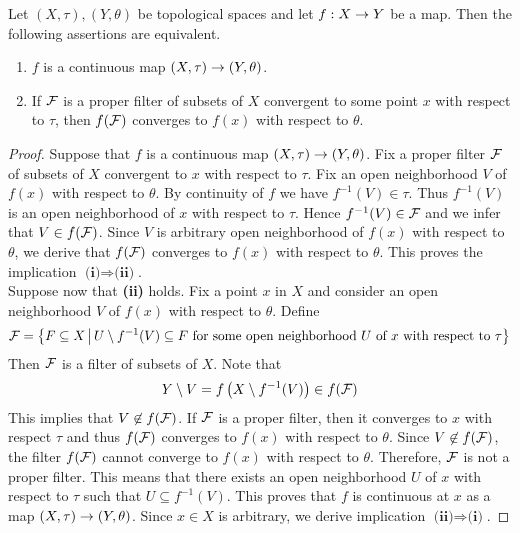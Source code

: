 \begin{proposition}\label{proposition:characterization_of_continuous_maps_in_terms_of_filters}
Let $(X,\tau),(Y,\theta)$ be topological spaces and let $f:X\rightarrow Y$ be a map. Then the following assertions are equivalent.
\begin{enumerate}[label=\emph{\textbf{(\roman*)}}, leftmargin=*]
\item $f$ is a continuous map $\left(X,\tau\right)\rightarrow \left(Y,\theta\right)$.
\item If ${\mathcal F}$ is a proper filter of subsets of $X$ convergent to some point $x$ with respect to $\tau$, then $f({\mathcal F})$ converges to $f(x)$ with respect to $\theta$.
\end{enumerate}
\end{proposition}
\begin{proof}
Suppose that $f$ is a continuous map $\left(X,\tau\right)\rightarrow \left(Y,\theta\right)$. Fix a proper filter ${\mathcal F}$ of subsets of $X$ convergent to $x$ with respect to $\tau$. Fix an open neighborhood $V$ of $f(x)$ with respect to $\theta$. By continuity of $f$ we have $f^{-1}(V) \in \tau$. Thus $f^{-1}(V)$ is an open neighborhood of $x$ with respect to $\tau$. Hence $f^{-1}(V) \in {\mathcal F}$ and we infer that $V \in f({\mathcal F})$. Since $V$ is arbitrary open neighborhood of $f(x)$ with respect to $\theta$, we derive that $f({\mathcal F})$ converges to $f(x)$ with respect to $\theta$. This proves the implication $\textbf{(i)}\Rightarrow \textbf{(ii)}$.\\
Suppose now that \textbf{(ii)} holds. Fix a point $x$ in $X$ and consider an open neighborhood $V$ of $f(x)$ with respect to $\theta$. Define
$${\mathcal F} = \big\{F\subseteq X\,\big|\,U\setminus f^{-1}(V)\subseteq F\mbox{ for some open neighborhood }U\mbox{ of }x\mbox{ with respect to }\tau\big\}$$
Then ${\mathcal F}$ is a filter of subsets of $X$. Note that
$$Y\setminus V = f\left(X\setminus f^{-1}(V)\right) \in f({\mathcal F})$$
This implies that $V \not \in f({\mathcal F})$. If ${\mathcal F}$ is a proper filter, then it converges to $x$ with respect $\tau$ and thus $f({\mathcal F})$ converges to $f(x)$ with respect to $\theta$. Since $V \not \in f({\mathcal F})$, the filter $f({\mathcal F})$ cannot converge to $f(x)$ with respect to $\theta$. Therefore, ${\mathcal F}$ is not a proper filter. This means that there exists an open neighborhood $U$ of $x$ with respect to $\tau$ such that $U \subseteq f^{-1}(V)$. This proves that $f$ is continuous at $x$ as a map $\left(X,\tau\right)\rightarrow \left(Y,\theta\right)$. Since $x\in X$ is arbitrary, we derive implication $\textbf{(ii)}\Rightarrow \textbf{(i)}$.
\end{proof}

